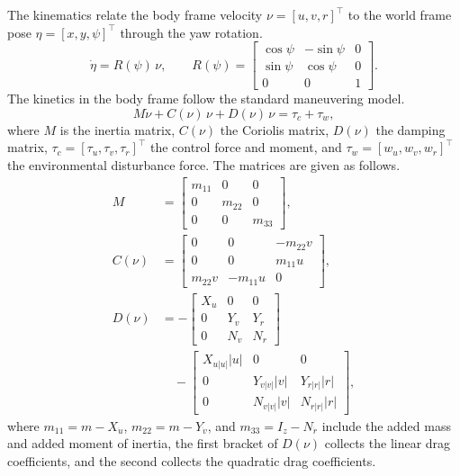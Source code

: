 \documentclass[5p,times,authoryear]{elsarticle}
\begin{document}
The kinematics relate the body frame velocity $\nu = [u, v, r]^\top$ to the world frame pose $\eta = [x, y, \psi]^\top$ through the yaw rotation.
\begin{equation}\label{eq_kin}
\dot\eta = R(\psi)\,\nu,\qquad
R(\psi) = \begin{bmatrix} \cos\psi & -\sin\psi & 0 \\ \sin\psi & \cos\psi & 0 \\ 0 & 0 & 1 \end{bmatrix}.
\end{equation}
The kinetics in the body frame follow the standard maneuvering model.
\begin{equation}\label{eq_kinetics}
M\dot\nu + C(\nu)\,\nu + D(\nu)\,\nu = \tau_c + \tau_w,
\end{equation}
where $M$ is the inertia matrix, $C(\nu)$ the Coriolis matrix, $D(\nu)$ the damping matrix, $\tau_c = [\tau_u, \tau_v, \tau_r]^\top$ the control force and moment, and $\tau_w = [w_u, w_v, w_r]^\top$ the environmental disturbance force. The matrices are given as follows.
\begin{subequations}\label{eq_matrices}
\begin{align}
M &= \begin{bmatrix} m_{11} & 0 & 0 \\ 0 & m_{22} & 0 \\ 0 & 0 & m_{33} \end{bmatrix}, \\[2pt]
C(\nu) &= \begin{bmatrix} 0 & 0 & -m_{22} v \\ 0 & 0 & m_{11} u \\ m_{22} v & -m_{11} u & 0 \end{bmatrix}, \\[2pt]
D(\nu) &= -\begin{bmatrix} X_u & 0 & 0 \\ 0 & Y_v & Y_r \\ 0 & N_v & N_r \end{bmatrix} \nonumber \\
&\quad -\begin{bmatrix} X_{u|u|}|u| & 0 & 0 \\ 0 & Y_{v|v|}|v| & Y_{r|r|}|r| \\ 0 & N_{v|v|}|v| & N_{r|r|}|r| \end{bmatrix},
\end{align}
\end{subequations}
where $m_{11}=m-X_{\dot u}$, $m_{22}=m-Y_{\dot v}$, and $m_{33}=I_z-N_{\dot r}$ include the added mass and added moment of inertia, the first bracket of $D(\nu)$ collects the linear drag coefficients, and the second collects the quadratic drag coefficients.
\end{document}
